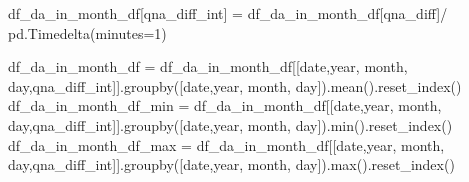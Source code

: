 \documentclass[
  letterpaper,
  DIV=11,
  numbers=noendperiod]{scrartcl}
\newenvironment{Shaded}{\begin{snugshade}}{\end{snugshade}}
\newcommand{\BuiltInTok}[1]{\textcolor[rgb]{0.00,0.23,0.31}{#1}}
\newcommand{\DecValTok}[1]{\textcolor[rgb]{0.68,0.00,0.00}{#1}}
\newcommand{\NormalTok}[1]{\textcolor[rgb]{0.00,0.23,0.31}{#1}}
\newcommand{\OperatorTok}[1]{\textcolor[rgb]{0.37,0.37,0.37}{#1}}
\newcommand{\StringTok}[1]{\textcolor[rgb]{0.13,0.47,0.30}{#1}}
\begin{document}
\begin{Shaded}
\begin{Highlighting}[]
\NormalTok{df\_da\_in\_month\_df[}\StringTok{\textquotesingle{}qna\_diff\_int\textquotesingle{}}\NormalTok{] }\OperatorTok{=}\NormalTok{ df\_da\_in\_month\_df[}\StringTok{\textquotesingle{}qna\_diff\textquotesingle{}}\NormalTok{]}\OperatorTok{/}\NormalTok{ pd.Timedelta(minutes}\OperatorTok{=}\DecValTok{1}\NormalTok{)}
\end{Highlighting}
\end{Shaded}

\begin{Shaded}
\begin{Highlighting}[]
\NormalTok{df\_da\_in\_month\_df        }\OperatorTok{=}\NormalTok{ df\_da\_in\_month\_df[[}\StringTok{\textquotesingle{}date\textquotesingle{}}\NormalTok{,}\StringTok{\textquotesingle{}year\textquotesingle{}}\NormalTok{, }\StringTok{\textquotesingle{}month\textquotesingle{}}\NormalTok{, }\StringTok{\textquotesingle{}day\textquotesingle{}}\NormalTok{,}\StringTok{\textquotesingle{}qna\_diff\_int\textquotesingle{}}\NormalTok{]].groupby([}\StringTok{\textquotesingle{}date\textquotesingle{}}\NormalTok{,}\StringTok{\textquotesingle{}year\textquotesingle{}}\NormalTok{, }\StringTok{\textquotesingle{}month\textquotesingle{}}\NormalTok{, }\StringTok{\textquotesingle{}day\textquotesingle{}}\NormalTok{]).mean().reset\_index()}
\NormalTok{df\_da\_in\_month\_df\_min    }\OperatorTok{=}\NormalTok{ df\_da\_in\_month\_df[[}\StringTok{\textquotesingle{}date\textquotesingle{}}\NormalTok{,}\StringTok{\textquotesingle{}year\textquotesingle{}}\NormalTok{, }\StringTok{\textquotesingle{}month\textquotesingle{}}\NormalTok{, }\StringTok{\textquotesingle{}day\textquotesingle{}}\NormalTok{,}\StringTok{\textquotesingle{}qna\_diff\_int\textquotesingle{}}\NormalTok{]].groupby([}\StringTok{\textquotesingle{}date\textquotesingle{}}\NormalTok{,}\StringTok{\textquotesingle{}year\textquotesingle{}}\NormalTok{, }\StringTok{\textquotesingle{}month\textquotesingle{}}\NormalTok{, }\StringTok{\textquotesingle{}day\textquotesingle{}}\NormalTok{]).}\BuiltInTok{min}\NormalTok{().reset\_index()}
\NormalTok{df\_da\_in\_month\_df\_max    }\OperatorTok{=}\NormalTok{ df\_da\_in\_month\_df[[}\StringTok{\textquotesingle{}date\textquotesingle{}}\NormalTok{,}\StringTok{\textquotesingle{}year\textquotesingle{}}\NormalTok{, }\StringTok{\textquotesingle{}month\textquotesingle{}}\NormalTok{, }\StringTok{\textquotesingle{}day\textquotesingle{}}\NormalTok{,}\StringTok{\textquotesingle{}qna\_diff\_int\textquotesingle{}}\NormalTok{]].groupby([}\StringTok{\textquotesingle{}date\textquotesingle{}}\NormalTok{,}\StringTok{\textquotesingle{}year\textquotesingle{}}\NormalTok{, }\StringTok{\textquotesingle{}month\textquotesingle{}}\NormalTok{, }\StringTok{\textquotesingle{}day\textquotesingle{}}\NormalTok{]).}\BuiltInTok{max}\NormalTok{().reset\_index()}

\end{Highlighting}
\end{Shaded}
\end{document}
